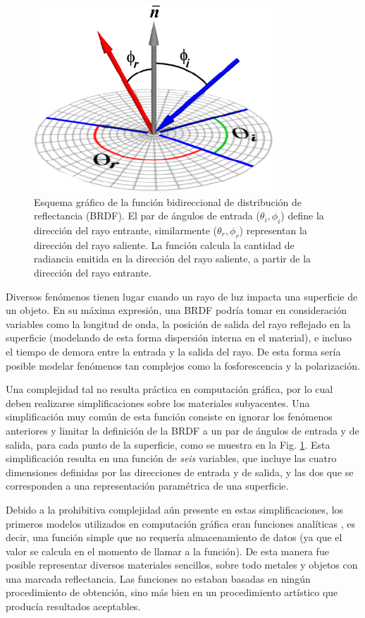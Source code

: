 \begin{figure}
\center
\includegraphics[width=9cm]{figures/brdf}
\caption[Esquema gráfico de la función bidireccional de distribución de reflectancia]{Esquema gráfico de la función bidireccional de distribución de reflectancia (BRDF). El par de ángulos de entrada ($\theta_{i},\phi_{i}$) define la dirección del rayo entrante, similarmente ($\theta_{r},\phi_{r}$) representan la dirección del rayo saliente. La función calcula la cantidad de radiancia emitida en la dirección del rayo saliente, a partir de la dirección del rayo entrante.}
\label{fg:brdf}
\end{figure}

Diversos fenómenos tienen lugar cuando un rayo de luz impacta una superficie de un objeto. En su máxima expresión, una BRDF podría tomar en consideración variables como la longitud de onda, la posición de salida del rayo reflejado en la superficie (modelando de esta forma dispersión interna en el material), e incluso el tiempo de demora entre la entrada y la salida del rayo.
De esta forma sería posible modelar fenómenos tan complejos como la fosforescencia y la polarización.

Una complejidad tal no resulta práctica en computación gráfica, por lo cual deben realizarse simplificaciones sobre los materiales subyacentes.
Una simplificación muy común de esta función consiste en ignorar los fenómenos anteriores y limitar la definición de la BRDF a un par de ángulos de entrada y de salida, para cada punto de la superficie, como se muestra en la Fig. \ref{fg:brdf}.
Esta simplificación resulta en una función de {\em seis} variables, que incluye las cuatro dimensiones definidas por las direcciones de entrada y de salida, y las dos que se corresponden a una representación paramétrica de una superficie.

Debido a la prohibitiva complejidad aún presente en estas simplificaciones, los primeros modelos utilizados en computación gráfica eran funciones analíticas \cite{Phong1975,Blinn1977}, es decir, una función simple que no requería almacenamiento de datos (ya que el valor se calcula en el momento de llamar a la función).
De esta manera fue posible representar diversos materiales sencillos, sobre todo metales y objetos con una marcada reflectancia.
Las funciones no estaban basadas en ningún procedimiento de obtención, sino más bien en un procedimiento artístico que producía resultados aceptables.

